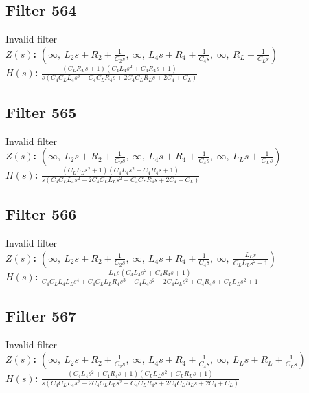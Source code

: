 \documentclass{article}
\begin{document}
\subsection*{Filter 564}
Invalid filter \\ 
\textbf{$Z(s)$:} $\left( \infty, \  L_{2} s + R_{2} + \frac{1}{C_{2} s}, \  \infty, \  L_{4} s + R_{4} + \frac{1}{C_{4} s}, \  \infty, \  R_{L} + \frac{1}{C_{L} s}\right)$ \\ 
\textbf{$H(s)$:} $\frac{\left(C_{L} R_{L} s + 1\right) \left(C_{4} L_{4} s^{2} + C_{4} R_{4} s + 1\right)}{s \left(C_{4} C_{L} L_{4} s^{2} + C_{4} C_{L} R_{4} s + 2 C_{4} C_{L} R_{L} s + 2 C_{4} + C_{L}\right)}$ \\ 
\subsection*{Filter 565}
Invalid filter \\ 
\textbf{$Z(s)$:} $\left( \infty, \  L_{2} s + R_{2} + \frac{1}{C_{2} s}, \  \infty, \  L_{4} s + R_{4} + \frac{1}{C_{4} s}, \  \infty, \  L_{L} s + \frac{1}{C_{L} s}\right)$ \\ 
\textbf{$H(s)$:} $\frac{\left(C_{L} L_{L} s^{2} + 1\right) \left(C_{4} L_{4} s^{2} + C_{4} R_{4} s + 1\right)}{s \left(C_{4} C_{L} L_{4} s^{2} + 2 C_{4} C_{L} L_{L} s^{2} + C_{4} C_{L} R_{4} s + 2 C_{4} + C_{L}\right)}$ \\ 
\subsection*{Filter 566}
Invalid filter \\ 
\textbf{$Z(s)$:} $\left( \infty, \  L_{2} s + R_{2} + \frac{1}{C_{2} s}, \  \infty, \  L_{4} s + R_{4} + \frac{1}{C_{4} s}, \  \infty, \  \frac{L_{L} s}{C_{L} L_{L} s^{2} + 1}\right)$ \\ 
\textbf{$H(s)$:} $\frac{L_{L} s \left(C_{4} L_{4} s^{2} + C_{4} R_{4} s + 1\right)}{C_{4} C_{L} L_{4} L_{L} s^{4} + C_{4} C_{L} L_{L} R_{4} s^{3} + C_{4} L_{4} s^{2} + 2 C_{4} L_{L} s^{2} + C_{4} R_{4} s + C_{L} L_{L} s^{2} + 1}$ \\ 
\subsection*{Filter 567}
Invalid filter \\ 
\textbf{$Z(s)$:} $\left( \infty, \  L_{2} s + R_{2} + \frac{1}{C_{2} s}, \  \infty, \  L_{4} s + R_{4} + \frac{1}{C_{4} s}, \  \infty, \  L_{L} s + R_{L} + \frac{1}{C_{L} s}\right)$ \\ 
\textbf{$H(s)$:} $\frac{\left(C_{4} L_{4} s^{2} + C_{4} R_{4} s + 1\right) \left(C_{L} L_{L} s^{2} + C_{L} R_{L} s + 1\right)}{s \left(C_{4} C_{L} L_{4} s^{2} + 2 C_{4} C_{L} L_{L} s^{2} + C_{4} C_{L} R_{4} s + 2 C_{4} C_{L} R_{L} s + 2 C_{4} + C_{L}\right)}$ \\ 
\end{document}
